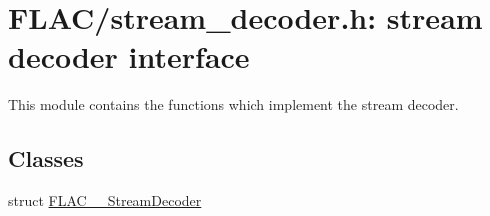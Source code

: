 \hypertarget{group__flac__stream__decoder}{}\section{F\+L\+A\+C/stream\+\_\+decoder.h\+: stream decoder interface}
\label{group__flac__stream__decoder}


This module contains the functions which implement the stream decoder.  


\subsection*{Classes}
\begin{DoxyCompactItemize}
\item 
struct \mbox{\hyperlink{struct_f_l_a_c_____stream_decoder}{F\+L\+A\+C\+\_\+\+\_\+\+Stream\+Decoder}}
\end{DoxyCompactItemize}
